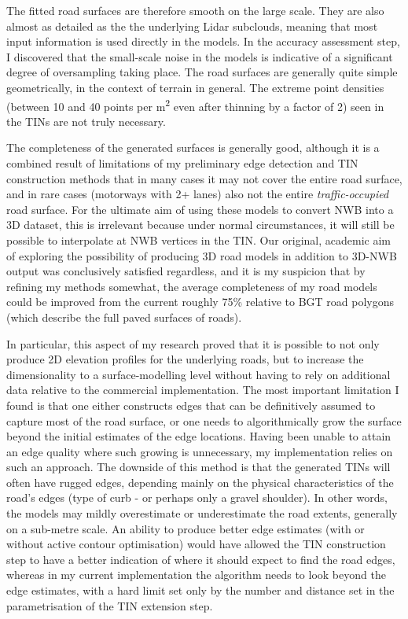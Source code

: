 The fitted road surfaces are therefore smooth on the large scale. They are also almost as detailed as the the underlying Lidar subclouds, meaning that most input information is used directly in the models. In the accuracy assessment step, I discovered that the small-scale noise in the models is indicative of a significant degree of oversampling taking place. The road surfaces are generally quite simple geometrically, in the context of terrain in general. The extreme point densities (between 10 and 40 points per m\textsuperscript{2} even after thinning by a factor of 2) seen in the TINs are not truly necessary.

The completeness of the generated surfaces is generally good, although it is a combined result of limitations of my preliminary edge detection and TIN construction methods that in many cases it may not cover the entire road surface, and in rare cases (motorways with 2+ lanes) also not the entire \textit{traffic-occupied} road surface. For the ultimate aim of using these models to convert NWB into a 3D dataset, this is irrelevant because under normal circumstances, it will still be possible to interpolate at NWB vertices in the TIN. Our original, academic aim of exploring the possibility of producing 3D road models in addition to 3D-NWB output was conclusively satisfied regardless, and it is my suspicion that by refining my methods somewhat, the average completeness of my road models could be improved from the current roughly 75\% relative to BGT road polygons (which describe the full paved surfaces of roads).

In particular, this aspect of my research proved that it is possible to not only produce 2D elevation profiles for the underlying roads, but to increase the dimensionality to a surface-modelling level without having to rely on additional data relative to the commercial implementation. The most important limitation I found is that one either constructs edges that can be definitively assumed to capture most of the road surface, or one needs to algorithmically grow the surface beyond the initial estimates of the edge locations. Having been unable to attain an edge quality where such growing is unnecessary, my implementation relies on such an approach. The downside of this method is that the generated TINs will often have rugged edges, depending mainly on the physical characteristics of the road's edges (type of curb - or perhaps only a gravel shoulder). In other words, the models may mildly overestimate or underestimate the road extents, generally on a sub-metre scale. An ability to produce better edge estimates (with or without active contour optimisation) would have allowed the TIN construction step to have a better indication of where it should expect to find the road edges, whereas in my current implementation the algorithm needs to look beyond the edge estimates, with a hard limit set only by the number and distance set in the parametrisation of the TIN extension step.

